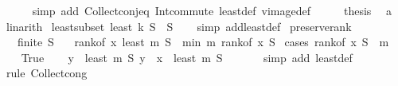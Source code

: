 \begin{isabellebody}
\ \ \ \ \isamarkupfalse%
\ {\isacharparenleft}{\kern0pt}simp\ add{\isacharcolon}{\kern0pt}\ Collect{\isacharunderscore}{\kern0pt}conj{\isacharunderscore}{\kern0pt}eq\ Int{\isacharunderscore}{\kern0pt}commute\ least{\isacharunderscore}{\kern0pt}def\ vimage{\isacharunderscore}{\kern0pt}def{\isacharparenright}{\kern0pt}\isanewline
\ \ \isamarkupfalse%
\ \isamarkupfalse%
\ {\isacharquery}{\kern0pt}thesis\ \isamarkupfalse%
\ a\ \isamarkupfalse%
\ linarith\isanewline
{}\isamarkupfalse%
%
\endisatagproof
{\isafoldproof}%
%
\isadelimproof
\isanewline
%
\endisadelimproof
\isanewline
{}\isamarkupfalse%
\ least{\isacharunderscore}{\kern0pt}subset{\isacharcolon}{\kern0pt}\ {\isachardoublequoteopen}least\ k\ S\ {\isasymsubseteq}\ S{\isachardoublequoteclose}\isanewline
%
\isadelimproof
\ \ %
\endisadelimproof
%
\isatagproof
{}\isamarkupfalse%
\ {\isacharparenleft}{\kern0pt}simp\ add{\isacharcolon}{\kern0pt}least{\isacharunderscore}{\kern0pt}def{\isacharparenright}{\kern0pt}%
\endisatagproof
{\isafoldproof}%
%
\isadelimproof
\isanewline
%
\endisadelimproof
\isanewline
{}\isamarkupfalse%
\ preserve{\isacharunderscore}{\kern0pt}rank{\isacharcolon}{\kern0pt}\isanewline
\ \ \ {\isachardoublequoteopen}finite\ S{\isachardoublequoteclose}\isanewline
\ \ \ {\isachardoublequoteopen}rank{\isacharunderscore}{\kern0pt}of\ x\ {\isacharparenleft}{\kern0pt}least\ m\ S{\isacharparenright}{\kern0pt}\ {\isacharequal}{\kern0pt}\ min\ m\ {\isacharparenleft}{\kern0pt}rank{\isacharunderscore}{\kern0pt}of\ x\ S{\isacharparenright}{\kern0pt}{\isachardoublequoteclose}\isanewline
%
\isadelimproof
%
\endisadelimproof
%
\isatagproof
{}\isamarkupfalse%
\ {\isacharparenleft}{\kern0pt}cases\ {\isachardoublequoteopen}rank{\isacharunderscore}{\kern0pt}of\ x\ S\ {\isasymge}\ m{\isachardoublequoteclose}{\isacharparenright}{\kern0pt}\isanewline
\ \ \isamarkupfalse%
\ True\isanewline
\ \ \isamarkupfalse%
\ {\isachardoublequoteopen}{\isacharbraceleft}{\kern0pt}y\ {\isasymin}\ least\ m\ S{\isachardot}{\kern0pt}\ y\ {\isacharless}{\kern0pt}\ x{\isacharbraceright}{\kern0pt}\ {\isacharequal}{\kern0pt}\ least\ m\ S{\isachardoublequoteclose}\ \isanewline
\ \ \ \ \isamarkupfalse%
\ {\isacharparenleft}{\kern0pt}simp\ add{\isacharcolon}{\kern0pt}\ least{\isacharunderscore}{\kern0pt}def{\isacharparenright}{\kern0pt}\isanewline
\ \ \ \ \isamarkupfalse%
\ {\isacharparenleft}{\kern0pt}rule\ Collect{\isacharunderscore}{\kern0pt}cong{\isacharparenright}{\kern0pt}\isanewline

\end{isabellebody}
